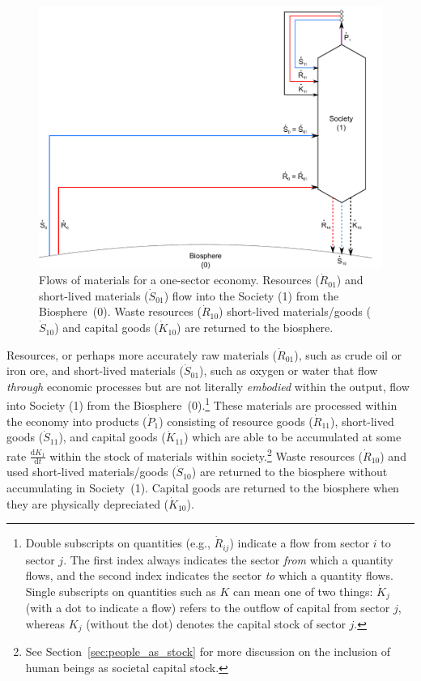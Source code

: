 \begin{landscape}
\begin{figure}[!ht]
\centering{}
\includegraphics[width=0.8\linewidth]{Part_1/Chapter_Materials/images/1_sector_materials.pdf}
\caption[Flows of materials for a one-sector economy]{Flows of materials 
for a one-sector economy. 
Resources ($\dot{R}_{01}$) and short-lived materials 
($\dot{S}_{01}$) flow into the Society (1) 
from the Biosphere~(0). Waste resources 
($\dot{R}_{10}$) short-lived materials/goods 
($\dot{S}_{10}$) and capital goods
($\dot{K}_{10}$) are returned to the biosphere.
}
\label{fig:A_materials}
\end{figure}
\end{landscape}

Resources, or perhaps more accurately raw materials
($\dot{R}_{01}$), such as crude oil or iron ore, 
and short-lived materials ($\dot{S}_{01}$), 
such as oxygen or water that flow 
\emph{through} economic processes but are not 
literally \emph{embodied} within the output, 
flow into Society (1) from the 
Biosphere~(0).\footnote{Double 
	subscripts on quantities
	(e.g., $\dot{R}_{ij}$) indicate a flow 
	from sector $i$ to sector $j$. 
	The first index always indicates the sector \emph{from} which a quantity flows, 
	and the second index indicates the sector \emph{to} which a quantity flows.
	Single subscripts on quantities such as
	$K$ can mean one of two things: 
	$\dot{K}_{j}$ (with a dot to indicate a flow) refers to 
	the outflow of capital from sector $j$, 
	whereas $K_{j}$ (without the dot) 
	denotes the capital stock of sector $j$.
	} 
These materials are processed within the economy 
into products ($\dot{P}_{1}$) consisting of 
resource goods ($\dot{R}_{11}$), 
short-lived goods ($\dot{S}_{11}$), 
and capital goods ($\dot{K}_{11}$)
which are able to be accumulated at some rate 
$\frac{\mathrm{d}K_{1}}{\mathrm{d}t}$ 
within the stock of materials within society.\footnote{See
	Section~\ref{sec:people_as_stock} for more discussion on
	the inclusion of human beings as societal capital stock.
	}
Waste resources ($\dot{R}_{10}$) and 
used short-lived materials/goods ($\dot{S}_{10}$)
are returned to the biosphere
without accumulating in Society~(1). 
Capital goods are returned to the biosphere
when they are physically depreciated ($\dot{K}_{10}$).


